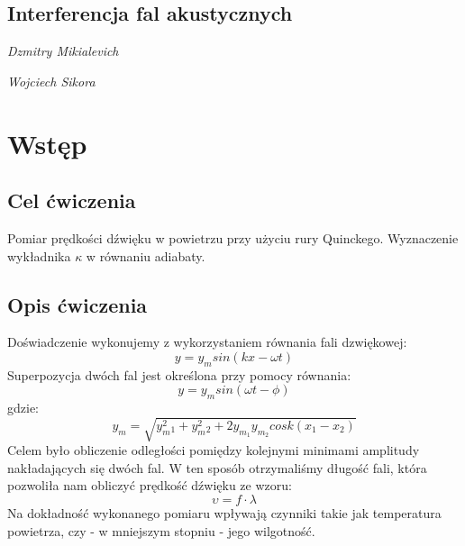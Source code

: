 \documentclass[]{article}
\begin{document}
\begin{figure}[tp!]
\end{figure}

\begin{center}
	\section*{Interferencja fal akustycznych }
	\emph{Dzmitry Mikialevich}
\end{center}
\begin{center}
	\emph{Wojciech Sikora}
\end{center}
\tableofcontents
\newpage

\section{Wstęp}

\subsection{Cel ćwiczenia}
Pomiar prędkości dźwięku w powietrzu przy użyciu rury Quinckego. Wyznaczenie wykładnika \(\kappa\) w
równaniu adiabaty.

    
\subsection{Opis ćwiczenia}
Doświadczenie wykonujemy z wykorzystaniem równania fali dzwiękowej: \[y=y_msin(kx-\omega t)\]
\newline
Superpozycja dwóch fal jest określona przy pomocy równania:
\[y=y_msin(\omega t-\phi)\] gdzie: \[y_m=\sqrt{y^2_m_1+y^2_m_2+2y_m_1y_m_2cosk(x_1-x_2) }\]
\newline
Celem było obliczenie odległości pomiędzy kolejnymi minimami amplitudy nakładających się
dwóch fal. W ten sposób otrzymaliśmy długość fali, która pozwoliła nam obliczyć prędkość dźwięku
ze wzoru:
\[\upsilon = f \cdot \lambda\]
\newline
Na dokładność wykonanego pomiaru wpływają czynniki takie jak temperatura powietrza, czy -
w mniejszym stopniu - jego wilgotność.
    
\end{document}
